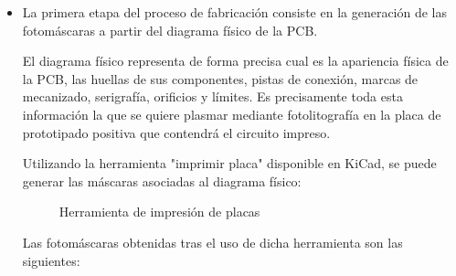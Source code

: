 \begin{itemize}
    \item La primera etapa del proceso de fabricación consiste en la generación de las fotomáscaras a partir del diagrama físico de la \ac{PCB}.
    
    El diagrama físico representa de forma precisa cual es la apariencia física de la \ac{PCB}, las huellas de sus componentes, pistas de conexión, marcas de mecanizado, serigrafía, orificios y límites. Es precisamente toda esta información la que se quiere plasmar mediante fotolitografía en la placa de prototipado positiva que contendrá el circuito impreso.
    
    Utilizando la herramienta "imprimir placa" disponible en KiCad, se puede generar las máscaras asociadas al diagrama físico:
    
    \begin{figure}[H]
    \centering
    \caption{Herramienta de impresión de placas} \label{fig:lego}
    \end{figure}
    
    Las fotomáscaras obtenidas tras el uso de dicha herramienta son las siguientes:
    

\end{itemize}
